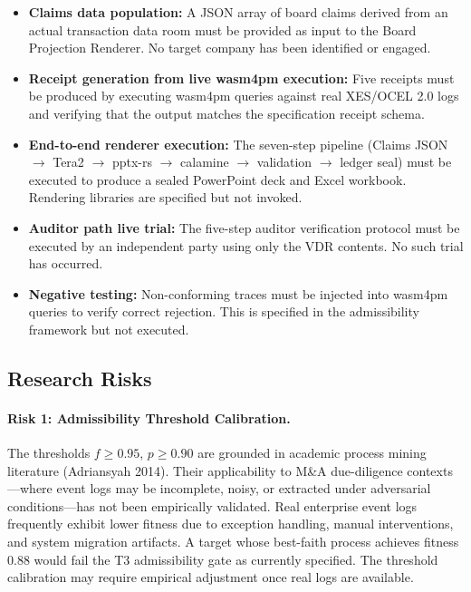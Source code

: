 \begin{itemize}
  \item \textbf{Claims data population:} A JSON array of board claims derived from an actual
    transaction data room must be provided as input to the Board Projection Renderer. No
    target company has been identified or engaged.
  \item \textbf{Receipt generation from live wasm4pm execution:} Five receipts must be
    produced by executing wasm4pm queries against real XES/OCEL 2.0 logs and verifying that
    the output matches the specification receipt schema.
  \item \textbf{End-to-end renderer execution:} The seven-step pipeline (Claims JSON $\to$
    Tera2 $\to$ pptx-rs $\to$ calamine $\to$ validation $\to$ ledger seal) must be executed
    to produce a sealed PowerPoint deck and Excel workbook. Rendering libraries are specified
    but not invoked.
  \item \textbf{Auditor path live trial:} The five-step auditor verification protocol must
    be executed by an independent party using only the VDR contents. No such trial has
    occurred.
  \item \textbf{Negative testing:} Non-conforming traces must be injected into wasm4pm
    queries to verify correct rejection. This is specified in the admissibility framework but
    not executed.
\end{itemize}

\subsection{Research Risks}
\label{sec:ma-gaps-risks}

\paragraph{Risk 1: Admissibility Threshold Calibration.}
The thresholds $f \ge 0.95$, $p \ge 0.90$ are grounded in academic process mining literature
(Adriansyah 2014). Their applicability to M\&A due-diligence contexts---where event logs may
be incomplete, noisy, or extracted under adversarial conditions---has not been empirically
validated. Real enterprise event logs frequently exhibit lower fitness due to exception
handling, manual interventions, and system migration artifacts. A target whose best-faith
process achieves fitness 0.88 would fail the T3 admissibility gate as currently specified.
The threshold calibration may require empirical adjustment once real logs are available.

